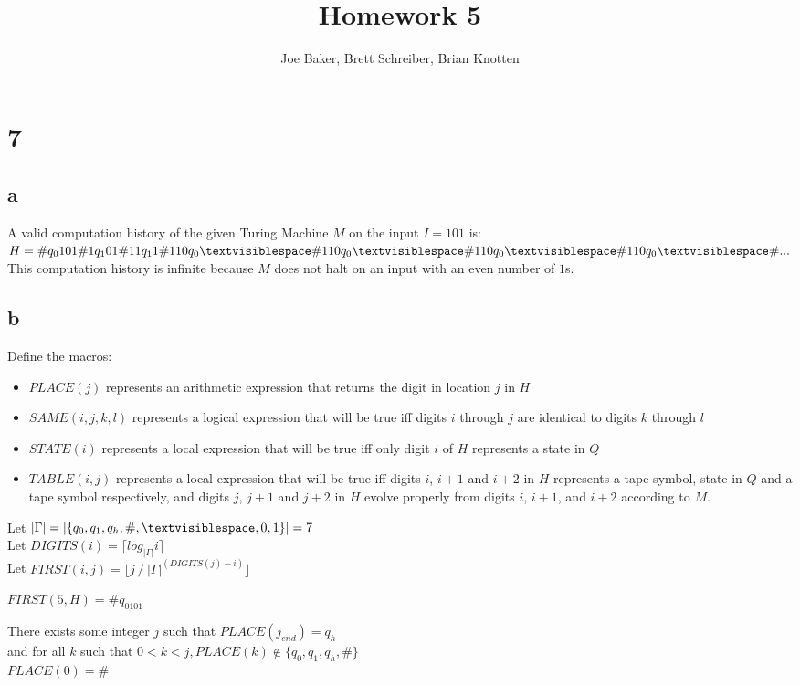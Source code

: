 \documentclass[letterpaper,notitlepage,twoside]{article}
\begin{document}
\title{Homework 5}
\author{Joe Baker, Brett Schreiber, Brian Knotten}
\maketitle

\section*{7}

\subsection*{a}
A valid computation history of the given Turing Machine $M$ on the input $I = 101$ is: \\
$H = \#q_{0}101\#1q_{1}01\#11q_{1}1\#110q_{0}\textvisiblespace \#110q_{0}\textvisiblespace \#110q_{0}\textvisiblespace \#110q_{0}\textvisiblespace \#...$ \\
This computation history is infinite because $M$ does not halt on an input with an even number of $1$s. \\
\subsection*{b}
Define the macros:
\begin{itemize}
\item $PLACE(j)$ represents an arithmetic expression that returns the digit in location $j$ in $H$
\item $SAME(i, j, k, l)$ represents a logical expression that will be true iff digits $i$ through $j$ are identical to digits $k$ through $l$
\item $STATE(i)$ represents a local expression that will be true iff only digit $i$ of $H$ represents a state in $Q$
\item $TABLE(i, j)$ represents a local expression that will be true iff digits $i$, $i+1$ and $i+2$ in $H$ represents a tape symbol, state in $Q$ and a tape symbol respectively, and digits $j$, $j+1$ and $j+2$ in $H$ evolve properly from digits $i$, $i+1$, and $i+2$ according to $M$.
\end{itemize}

Let $|\Gamma| = |\{q_0, q_1, q_h, \#, \textvisiblespace, 0, 1\}| = 7$ \\

Let $DIGITS(i) = \lceil log_{|\Gamma|}i \rceil$ \\ 

Let $FIRST(i, j) = \lfloor j \mathbin{/} |\Gamma|^{(DIGITS(j) - i)} \rfloor$

$FIRST(5, H) = \#q_0101$


There exists some integer $j$ such that $PLACE(j_{end}) = q_h$ \\
and for all $k$ such that $0 < k < j, PLACE(k) \notin \{q_0, q_1, q_h, \# \}$ \\

$PLACE(0) = \#$
\end{document}
